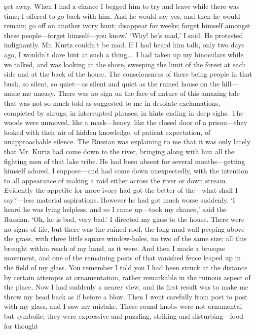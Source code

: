 \documentclass[12pt]{report}
\begin{document}
get away. When I had a chance I begged him to try and leave while there
was time; I offered to go back with him. And he would say yes, and then
he would remain; go off on another ivory hunt; disappear for weeks;
forget himself amongst these people---forget himself---you know.' `Why!
he's mad,' I said. He protested indignantly. Mr. Kurtz couldn't be mad.
If I had heard him talk, only two days ago, I wouldn't dare hint at such
a thing\ldots{}. I had taken up my binoculars while we talked, and was
looking at the shore, sweeping the limit of the forest at each side and
at the back of the house. The consciousness of there being people in
that bush, so silent, so quiet---as silent and quiet as the ruined house
on the hill---made me uneasy. There was no sign on the face of nature of
this amazing tale that was not so much told as suggested to me in
desolate exclamations, completed by shrugs, in interrupted phrases, in
hints ending in deep sighs. The woods were unmoved, like a mask---heavy,
like the closed door of a prison---they looked with their air of hidden
knowledge, of patient expectation, of unapproachable silence. The
Russian was explaining to me that it was only lately that Mr. Kurtz had
come down to the river, bringing along with him all the fighting men of
that lake tribe. He had been absent for several months---getting himself
adored, I suppose---and had come down unexpectedly, with the intention
to all appearance of making a raid either across the river or down
stream. Evidently the appetite for more ivory had got the better of
the---what shall I say?---less material aspirations. However he had got
much worse suddenly. `I heard he was lying helpless, and so I came
up---took my chance,' said the Russian. `Oh, he is bad, very bad.' I
directed my glass to the house. There were no signs of life, but there
was the ruined roof, the long mud wall peeping above the grass, with
three little square window-holes, no two of the same size; all this
brought within reach of my hand, as it were. And then I made a brusque
movement, and one of the remaining posts of that vanished fence leaped
up in the field of my glass. You remember I told you I had been struck
at the distance by certain attempts at ornamentation, rather remarkable
in the ruinous aspect of the place. Now I had suddenly a nearer view,
and its first result was to make me throw my head back as if before a
blow. Then I went carefully from post to post with my glass, and I saw
my mistake. These round knobs were not ornamental but symbolic; they
were expressive and puzzling, striking and disturbing---food for thought
\end{document}
